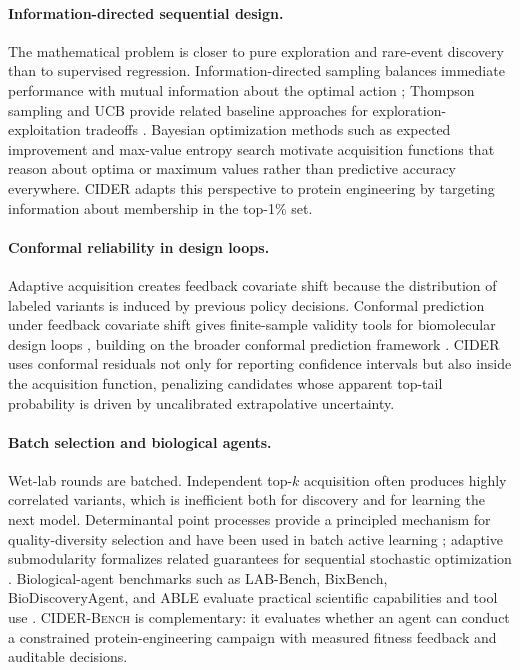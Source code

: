 \documentclass{article}
\newcommand{\method}{\textsc{CIDER}}
\newcommand{\bench}{\textsc{CIDER-Bench}}
\newcommand{\topone}{top-1\%}
\begin{document}
\paragraph{Information-directed sequential design.} The mathematical problem is closer to pure exploration and rare-event discovery than to supervised regression. Information-directed sampling balances immediate performance with mutual information about the optimal action \citep{russo2018ids}; Thompson sampling and UCB provide related baseline approaches for exploration-exploitation tradeoffs \citep{russo2018tutorial,auer2002ucb}. Bayesian optimization methods such as expected improvement \citep{jones1998ego} and max-value entropy search \citep{wang2017mes} motivate acquisition functions that reason about optima or maximum values rather than predictive accuracy everywhere. \method{} adapts this perspective to protein engineering by targeting information about membership in the \topone{} set.

\paragraph{Conformal reliability in design loops.} Adaptive acquisition creates feedback covariate shift because the distribution of labeled variants is induced by previous policy decisions. Conformal prediction under feedback covariate shift gives finite-sample validity tools for biomolecular design loops \citep{fannjiang2022conformal}, building on the broader conformal prediction framework \citep{vovk2005conformal}. \method{} uses conformal residuals not only for reporting confidence intervals but also inside the acquisition function, penalizing candidates whose apparent top-tail probability is driven by uncalibrated extrapolative uncertainty.

\paragraph{Batch selection and biological agents.} Wet-lab rounds are batched. Independent top-$k$ acquisition often produces highly correlated variants, which is inefficient both for discovery and for learning the next model. Determinantal point processes provide a principled mechanism for quality-diversity selection \citep{kulesza2012dpp} and have been used in batch active learning \citep{biyik2019dpp}; adaptive submodularity formalizes related guarantees for sequential stochastic optimization \citep{golovin2011adaptive}. Biological-agent benchmarks such as LAB-Bench, BixBench, BioDiscoveryAgent, and ABLE evaluate practical scientific capabilities and tool use \citep{laurent2024labbench,mitchener2025bixbench,roohani2024biodiscovery,able2025}. \bench{} is complementary: it evaluates whether an agent can conduct a constrained protein-engineering campaign with measured fitness feedback and auditable decisions.
\end{document}
